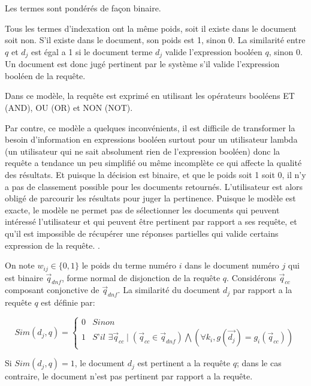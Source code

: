 Les termes sont pondérés de façon binaire.

Tous les termes d'indexation ont la même poids, soit il existe dans le document soit non. S'il existe dans le document, son poids est 1, sinon 0. La similarité entre $q$ et $d_{j}$ est égal a 1 si le document terme $d_{j}$ valide l'expression booléen $q$, sinon 0. Un document est donc jugé pertinent par le système s'il valide l'expression booléen de la requête.

Dans ce modèle, la requête est exprimé en utilisant les opérateurs booléens ET (AND), OU (OR) et NON (NOT).

Par contre, ce modèle a quelques inconvénients, il est difficile de transformer la besoin d'information en expressions booléen surtout pour un utilisateur lambda (un utilisateur qui ne sait absolument rien de l'expression booléen) donc la requête a tendance un peu simplifié ou même incomplète ce qui affecte la qualité des résultats. Et puisque la décision est binaire, et que le poids soit 1 soit 0, il n'y a pas de classement possible pour les documents retournés. L'utilisateur est alors obligé de parcourir les résultats pour juger la pertinence. Puisque le modèle est exacte, le modèle ne permet pas de sélectionner les documents qui peuvent intéressé l'utilisateur et qui peuvent être pertinent par rapport a ses requête, et qu'il est impossible de récupérer une réponses partielles qui valide certains expression de la requête. \citep*{modern-ir, soulier2014:def-evaluation-modele}.

\begin{definition}
    On note $w_{ij} \in \{0, 1\}$ le poids du terme numéro $i$ dans le document numéro $j$ qui est binaire $ \vec{q}_{dnf} $, forme normal de disjonction de la requête $ q $. Considérons $ \vec{q}_{cc} $ composant conjonctive de $ \vec{q}_{dnf} $. La similarité du document $ d_{j} $ par rapport a la requête $ q $ est définie par:

    \[
        Sim(d_{j}, q) = \left\{
        \begin{array}{ll}
            0 & Sinon \\
            1 & \textit{S'il } \exists \vec{q}_{cc} \mid (\vec{q}_{cc} \in \vec{q}_{dnf}) \bigwedge (\forall k_{i}, g(\vec{d_{j}}) = g_{i}(\vec{q}_{cc}))
        \end{array}
        \right.
    \]

    Si $ Sim(d_{j}, q) = 1$, le document $ d_{j} $ est pertinent a la requête $ q $; dans le cas contraire, le document n'est pas pertinent par rapport a la requête.
\end{definition}

